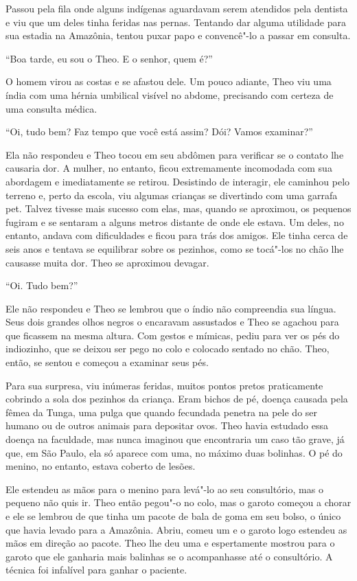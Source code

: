 Passou pela fila onde alguns indígenas aguardavam serem atendidos pela
dentista e viu que um deles tinha feridas nas pernas. Tentando dar
alguma utilidade para sua estadia na Amazônia, tentou puxar papo e
convencê"-lo a passar em consulta.

``Boa tarde, eu sou o Theo. E o senhor, quem é?''

O homem virou as costas e se afastou dele. Um pouco adiante, Theo viu
uma índia com uma hérnia umbilical visível no abdome, precisando com
certeza de uma consulta médica.

``Oi, tudo bem? Faz tempo que você está assim? Dói? Vamos examinar?''

Ela não respondeu e Theo tocou em seu abdômen para verificar se o
contato lhe causaria dor. A mulher, no entanto, ficou extremamente
incomodada com sua abordagem e imediatamente se retirou. Desistindo de
interagir, ele caminhou pelo terreno e, perto da escola, viu algumas
crianças se divertindo com uma garrafa pet. Talvez tivesse mais sucesso
com elas, mas, quando se aproximou, os pequenos fugiram e se sentaram a
alguns metros distante de onde ele estava. Um deles, no entanto, andava
com dificuldades e ficou para trás dos amigos. Ele tinha cerca de seis
anos e tentava se equilibrar sobre os pezinhos, como se tocá"-los no chão
lhe causasse muita dor. Theo se aproximou devagar.

``Oi. Tudo bem?''

Ele não respondeu e Theo se lembrou que o índio não compreendia sua
língua. Seus dois grandes olhos negros o encaravam assustados e Theo se
agachou para que ficassem na mesma altura. Com gestos e mímicas, pediu
para ver os pés do indiozinho, que se deixou ser pego no colo e colocado
sentado no chão. Theo, então, se sentou e começou a examinar seus pés.

Para sua surpresa, viu inúmeras feridas, muitos pontos pretos
praticamente cobrindo a sola dos pezinhos da criança. Eram bichos de pé,
doença causada pela fêmea da Tunga, uma pulga que quando fecundada
penetra na pele do ser humano ou de outros animais para depositar ovos.
Theo havia estudado essa doença na faculdade, mas nunca imaginou que
encontraria um caso tão grave, já que, em São Paulo, ela só aparece com
uma, no máximo duas bolinhas. O pé do menino, no entanto, estava coberto
de lesões.

Ele estendeu as mãos para o menino para levá"-lo ao seu consultório, mas
o pequeno não quis ir. Theo então pegou"-o no colo, mas o garoto começou
a chorar e ele se lembrou de que tinha um pacote de bala de goma em seu
bolso, o único que havia levado para a Amazônia. Abriu, comeu um e o
garoto logo estendeu as mãos em direção ao pacote. Theo lhe deu uma e
espertamente mostrou para o garoto que ele ganharia mais balinhas se o
acompanhasse até o consultório. A técnica foi infalível para ganhar o
paciente.

